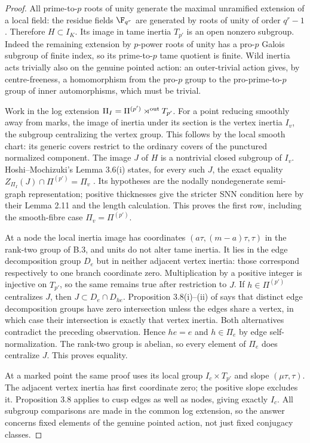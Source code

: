 \begin{proof}
All prime-to-$p$ roots of unity generate the maximal unramified extension
of a local field: the residue fields $\F_{q^r}$ are generated by roots of
unity of order $q^r-1$. Therefore $H\subset I_K$. Its image in tame inertia
$T_{p'}$ is an open nonzero subgroup. Indeed the remaining extension by
$p$-power roots of unity has a pro-$p$ Galois subgroup of finite index,
so its prime-to-$p$ tame quotient is finite. Wild inertia acts trivially
also on the genuine pointed action: an outer-trivial action gives, by
centre-freeness, a homomorphism from the pro-$p$ group to the pro-prime-to-$p$
group of inner automorphisms, which must be trivial.

Work in the log extension $\Pi_I=\Pi^{(p')}\rtimes^{\rm out}T_{p'}$.
For a point reducing smoothly away from marks, the image of inertia under
its section is the vertex inertia $I_v$, the subgroup centralizing the
vertex group. This follows by the local smooth chart: its generic covers
restrict to the ordinary covers of the punctured normalized component.
The image $J$ of $H$ is a nontrivial closed subgroup of $I_v$.
Hoshi--Mochizuki's Lemma 3.6(i) states, for every such $J$, the exact
equality
$Z_{\Pi_I}(J)\cap\Pi^{(p')}=\Pi_v$
\citep[Lemma 3.6]{BC_HMNodes}. Its hypotheses are the nodally nondegenerate
semi-graph representation; positive thicknesses give the stricter SNN
condition here by their Lemma 2.11 and the length calculation. This proves
the first row, including the smooth-fibre case $\Pi_v=\Pi^{(p')}$.

At a node the local inertia image has coordinates
$(a\tau,(m-a)\tau,\tau)$ in the rank-two group of B.3, and units do not
alter tame inertia. It lies in the edge decomposition group $D_e$ but in
neither adjacent vertex inertia: those correspond respectively to one
branch coordinate zero. Multiplication by a positive integer is injective
on $T_{p'}$, so the same remains true after restriction to $J$.
If $h\in\Pi^{(p')}$ centralizes $J$, then
$J\subset D_e\cap D_{he}$. Proposition 3.8(i)--(ii) of
\citet{BC_HMNodes} says that distinct edge decomposition groups have zero
intersection unless the edges share a vertex, in which case their
intersection is exactly that vertex inertia. Both alternatives contradict
the preceding observation. Hence $he=e$ and $h\in\Pi_e$ by edge
self-normalization. The rank-two group is abelian, so every element of
$\Pi_e$ does centralize $J$. This proves equality.

At a marked point the same proof uses its local group
$I_c\times T_{p'}$ and slope $(\mu\tau,\tau)$. The adjacent vertex inertia
has first coordinate zero; the positive slope excludes it. Proposition
3.8 applies to cusp edges as well as nodes, giving exactly $I_c$.
All subgroup comparisons are made in the common log extension, so the
answer concerns fixed elements of the genuine pointed action, not just
fixed conjugacy classes.
\end{proof}

